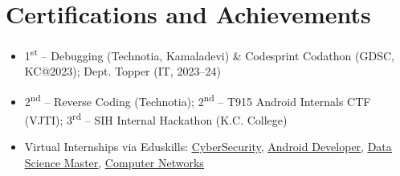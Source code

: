 \documentclass[a4paper,11pt]{article}
\newcommand{\resumeItem}[1]{
  \item\small{#1}
}
\newcommand{\resumeItemListStart}{\begin{itemize}[rightmargin=0.11in]}
\newcommand{\resumeItemListEnd}{\end{itemize}}
\begin{document}
\section{Certifications and Achievements}
\resumeItemListStart{}
  \resumeItem{1\textsuperscript{st} – Debugging (Technotia, Kamaladevi) \& Codesprint Codathon (GDSC, KC@2023); Dept. Topper (IT, 2023–24)} 
  \resumeItem{2\textsuperscript{nd} – Reverse Coding (Technotia); 2\textsuperscript{nd} – T915 Android Internals CTF (VJTI); 3\textsuperscript{rd} – SIH Internal Hackathon (K.C. College)}
  \resumeItem{Virtual Internships via Eduskills: \href{https://aictecert.eduskillsfoundation.org/pages/home/verify.php?cert=302f1886823167c7ef0ef578223c072f}{\uline{CyberSecurity}}, \href{https://aictecert.eduskillsfoundation.org/pages/home/verify.php?cert=9d7218a4a5c5ededd2b49dfc987bbf61}{\uline{Android Developer}}, \href{https://aictecert.eduskillsfoundation.org/pages/home/verify.php?cert=13bcb2d0ecf9d2b4c0cfd2e236300456}{\uline{Data Science Master}}, \href{https://aictecert.eduskillsfoundation.org/pages/home/verify.php?cert=cfae1e9e1eecb2a6b907475e90b5e31f}{\uline{Computer Networks}}}

\resumeItemListEnd{}

\end{document}
